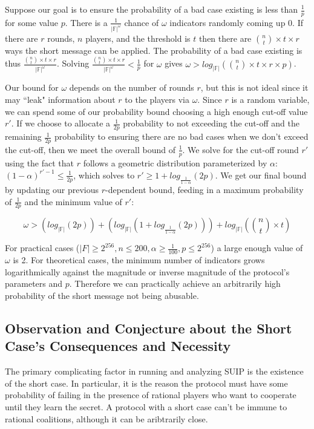 \documentclass{dalcsthesis}
\begin{document}
Suppose our goal is to ensure the probability of a bad case existing is less than $\frac{1}{p}$ for some value $p$. There is a $\frac{1}{|\mathbb{F}|^\omega}$ chance of $\omega$ indicators randomly coming up 0. If there are $r$ rounds, $n$ players, and the threshold is $t$ then there are $\binom{n}{t} \times t \times r$ ways the short message can be applied. The probability of a bad case existing is thus $\frac{\binom{n}{t} \times t \times r}{|\mathbb{F}|^\omega}$. Solving $\frac{\binom{n}{t} \times t \times r}{|\mathbb{F}|^\omega} < \frac{1}{p}$ for $\omega$ gives $\omega > log_{|\mathbb{F}|} (\binom{n}{t} \times t \times r \times p)$.

Our bound for $\omega$ depends on the number of rounds $r$, but this is not ideal since it may ``leak" information about $r$ to the players via $\omega$. Since $r$ is a random variable, we can spend some of our probability bound choosing a high enough cut-off value $r'$. If we choose to allocate a $\frac{1}{2 p}$ probability to not exceeding the cut-off and the remaining $\frac{1}{2 p}$ probability to ensuring there are no bad cases when we don't exceed the cut-off, then we meet the overall bound of $\frac{1}{p}$. We solve for the cut-off round $r'$ using the fact that $r$ follows a geometric distribution parameterized by $\alpha$: $(1 - \alpha)^{r'-1} \leq \frac{1}{2 p}$, which solves to $r' \geq 1 + log_{\frac{1}{1-\alpha}}(2 p)$. We get our final bound by updating our previous $r$-dependent bound, feeding in a maximum probability of $\frac{1}{2 p}$ and the minimum value of $r'$:

$$\omega > \left(log_{|\mathbb{F}|} (2 p)\right) + \left(log_{|\mathbb{F}|} \left(1 + log_{\frac{1}{1-\alpha}}(2 p)\right)\right) + log_{|\mathbb{F}|} \left(\binom{n}{t} \times t\right)$$

For practical cases ($|F| \geq 2^{256}, n \leq 200, \alpha \geq \frac{1}{100}, p \leq 2^{256}$) a large enough value of $\omega$ is 2. For theoretical cases, the minimum number of indicators grows logarithmically against the magnitude or inverse magnitude of the protocol's parameters and $p$. Therefore we can practically achieve an arbitrarily high probability of the short message not being abusable.

\subsection{Observation and Conjecture about the Short Case's Consequences and Necessity}

The primary complicating factor in running and analyzing SUIP is the existence of the short case. In particular, it is the reason the protocol must have some probability of failing in the presence of rational players who want to cooperate until they learn the secret. A protocol with a short case can't be immune to rational coalitions, although it can be aribtrarily close.
\end{document}
